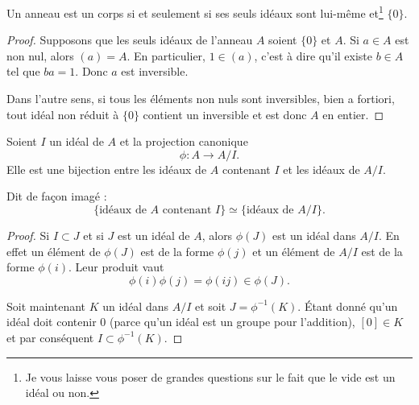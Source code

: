 \begin{proposition}     \label{PROPooUOCVooZGAVVk}
    Un anneau est un corps si et seulement si ses seuls idéaux sont lui-même et\footnote{Je vous laisse vous poser de grandes questions sur le fait que le vide est un idéal ou non.} \( \{ 0 \}\).
\end{proposition}

\begin{proof}
    Supposons que les seuls idéaux de l'anneau \( A\) soient \( \{ 0 \}\) et \( A\). Si \( a\in A\) est non nul, alors \( (a)=A\). En particulier, \( 1\in (a)\), c'est à dire qu'il existe \( b\in A\) tel que \( ba=1\). Donc \( a\) est inversible.

    Dans l'autre sens, si tous les éléments non nuls sont inversibles, bien a fortiori, tout idéal non réduit à \( \{ 0 \}\) contient un inversible et est donc \( A\) en entier.
\end{proof}

\begin{proposition}     \label{PropIJJIdsousphi}
    Soient \( I\) un idéal de \( A\) et la projection canonique 
    \begin{equation}
        \phi\colon A\to A/I.
    \end{equation}
    Elle est une bijection entre les idéaux de \( A\) contenant \( I\) et les idéaux de \( A/I\).

    Dit de façon imagé : 
    \begin{equation}        \label{EqKbrizu}
        \{ \text{idéaux de } A\text{ contenant } I\}\simeq\{ \text{idéaux de } A/I \}.
    \end{equation}
\end{proposition}

\begin{proof}
    Si \( I\subset J\) et si \( J \) est un idéal de \( A\), alors \( \phi(J)\) est un idéal dans \( A/I\). En effet un élément de \( \phi(J)\) est de la forme \( \phi(j)\) et un élément de \( A/I\) est de la forme \( \phi(i)\). Leur produit vaut
    \begin{equation}
        \phi(i)\phi(j)=\phi(ij)\in\phi(J).
    \end{equation}
    
    Soit maintenant \( K\) un idéal dans \( A/I\) et soit \( J=\phi^{-1}(K)\). Étant donné qu'un idéal doit contenir \( 0\) (parce qu'un idéal est un groupe pour l'addition), \( [0]\in K\) et par conséquent \( I\subset\phi^{-1}(K)\).
\end{proof}

